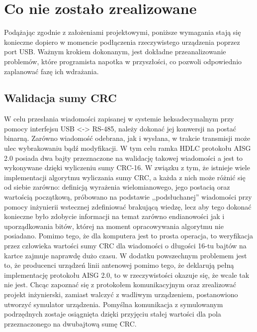     \newpage
    \section{Co nie zostało zrealizowane}
    Podążając zgodnie z założeniami projektowymi, poniższe wymagania stają się konieczne dopiero w momencie podłączenia rzeczywistego urządzenia
    poprzez port USB. Ważnym krokiem dokonanym, jest dokładne przeanalizowanie problemów, które programista napotka w przyszłości,
    co pozwoli odpowiednio zaplanować fazę ich wdrażania.


    \subsection{Walidacja sumy CRC}
    W celu przesłania wiadomości zapisanej w systemie heksadecymalnym przy pomocy interfejsu USB <-> RS-485,
    należy dokonać jej konwersji na postać binarną. Zarówno wiadomość odebrana, jak i wysłana, w trakcie transmisji może ulec wybrakowaniu bądź
    modyfikacji. W tym celu ramka HDLC protokołu AISG 2.0 posiada dwa bajty przeznaczone na walidację takowej wiadomości a jest to wykonywane
    dzięki wyliczeniu sumy CRC-16. W związku z tym, że istnieje wiele implementacji algorytmu wyliczania sumy CRC, a każda z nich może różnić się od siebie zarówno:
    definicją wyrażenia wielomianowego, jego postacią oraz wartością początkową, próbowano na podstawie ,,podsłuchanej'' wiadomości przy pomocy
    inżynierii wstecznej zdefiniować brakującą wiedzę, lecz aby tego dokonać konieczne było zdobycie informacji na temat zarówno endianowości
    jak i uporządkowania bitów, której na moment opracowywania algorytmu nie posiadano. Pomimo tego, że dla komputera jest to prosta operacja, to weryfikacja przez człowieka
    wartości sumy CRC dla wiadomości o długości 16-tu bajtów na kartce zajmuje naprawdę dużo czasu. W dodatku powszechnym problemem jest to, że 
    producenci urządzeń linii antenowej pomimo tego, że deklarują pełną implementację protokołu AISG 2.0, to w rzeczywistości okazuje się, że
    wcale tak nie jest. Chcąc zapoznać się z protokołem komunikacyjnym oraz zrealizować projekt inżynierski, zamiast walczyć z
    wadliwym urządzeniem, postanowiono utworzyć symulator urządzenia. Pomyślna komunikacja z symulowanym podrzędnych zostaje osiągnięta dzięki przyjęciu stałej wartości
    dla pola przeznaczonego na dwubajtową sumę CRC.
   

